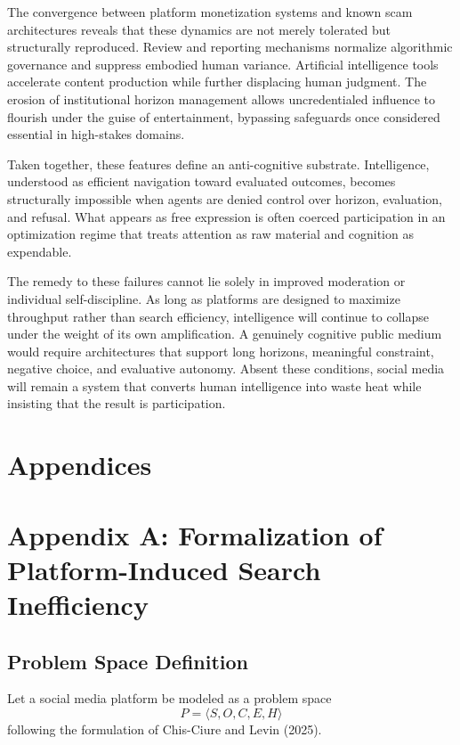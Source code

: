 \documentclass[12pt]{article}
\begin{document}
The convergence between platform monetization systems and known scam architectures reveals that these dynamics are not merely tolerated but structurally reproduced. Review and reporting mechanisms normalize algorithmic governance and suppress embodied human variance. Artificial intelligence tools accelerate content production while further displacing human judgment. The erosion of institutional horizon management allows uncredentialed influence to flourish under the guise of entertainment, bypassing safeguards once considered essential in high-stakes domains.

Taken together, these features define an anti-cognitive substrate. Intelligence, understood as efficient navigation toward evaluated outcomes, becomes structurally impossible when agents are denied control over horizon, evaluation, and refusal. What appears as free expression is often coerced participation in an optimization regime that treats attention as raw material and cognition as expendable.

The remedy to these failures cannot lie solely in improved moderation or individual self-discipline. As long as platforms are designed to maximize throughput rather than search efficiency, intelligence will continue to collapse under the weight of its own amplification. A genuinely cognitive public medium would require architectures that support long horizons, meaningful constraint, negative choice, and evaluative autonomy. Absent these conditions, social media will remain a system that converts human intelligence into waste heat while insisting that the result is participation.

\newpage
\section*{Appendices}

\appendix

\section{Appendix A: Formalization of Platform-Induced Search Inefficiency}

\subsection{Problem Space Definition}

Let a social media platform be modeled as a problem space
\[
P = \langle S, O, C, E, H \rangle
\]
following the formulation of Chis-Ciure and Levin (2025).
\end{document}
